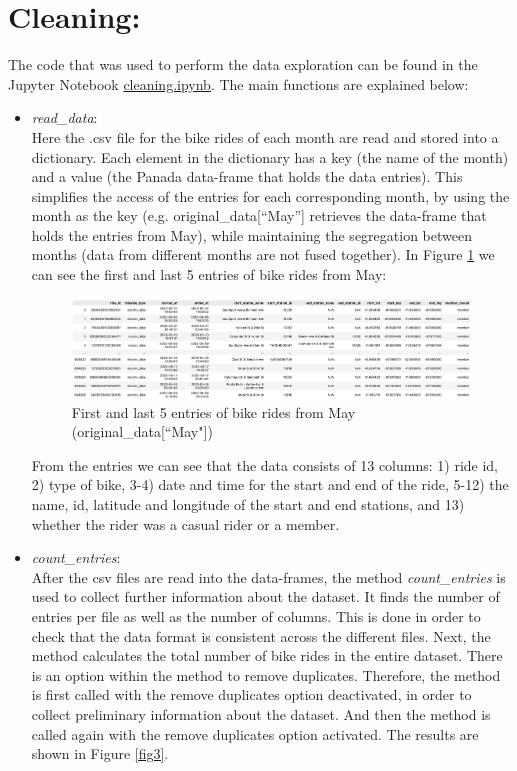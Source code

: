 \documentclass[12pt]{article}
\begin{document}
\section*{Cleaning:}
The code that was used to perform the data exploration can be found in the Jupyter Notebook \href{https://github.com/SummerKassem/BikeShareCS/blob/main/Code/cleaning.ipynb}{cleaning.ipynb}. The main functions are explained below:
\begin{itemize}
	\item \textit{read\_data}:\\
	Here the .csv file for the bike rides of each month are read and stored into a dictionary. Each element in the dictionary has a key (the name of the month) and a value (the Panada data-frame that holds the data entries). This simplifies the access of the entries for each corresponding month, by using the month as the key (e.g. original\_data[“May”] retrieves the data-frame that holds the entries from May), while maintaining the segregation between months (data from different months are not fused together). In Figure \ref{fig1} we can see the first and last 5 entries of bike rides from May:

	\begin{figure}[h]
	\hspace{-1.8cm}
	\includegraphics[width=8 in, height = 2 in]{imgMay.png}
	\caption{First and last 5 entries of bike rides from May (original\_data[``May"])}
	\label{fig1}
	\end{figure}
	\pagebreak
	
	From the entries we can see that the data consists of 13 columns: 1) ride id, 2) type of bike, 3-4) date and time for the start and end of the ride, 5-12) the name, id, latitude and longitude of the start and end stations, and 13) whether the rider was a casual rider or a member. 
	
	\item \textit{count\_entries}:\\
	After the csv files are read into the data-frames, the method \textit{count\_entries} is used to collect further information about the dataset. It finds the number of entries per file as well as the number of columns. This is done in order to check that the data format is consistent across the different files. Next, the method calculates the total number of bike rides in the entire dataset. There is an option within the method to remove duplicates. Therefore, the method is first called with the remove duplicates option deactivated, in order to collect preliminary information about the dataset. And then the method is called again with the remove duplicates option activated. The results are shown in Figure \ref{fig3}. 
	

\end{itemize}
\end{document}
